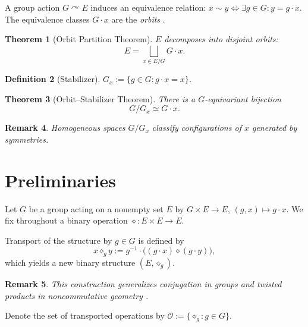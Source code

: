 \documentclass[11pt,a4paper]{article}
\newtheorem{theorem}{Theorem}[section]
\newtheorem{definition}[theorem]{Definition}
\newtheorem{remark}[theorem]{Remark}
\begin{document}
	A group action $G \curvearrowright E$ induces an equivalence relation: $x \sim y \iff \exists g \in G : y = g \cdot x$.
	The equivalence classes $G \cdot x$ are the \emph{orbits} \cite{Serre}.
	
	\begin{theorem}[Orbit Partition Theorem]
		$E$ decomposes into disjoint orbits:
		\[
		E = \bigsqcup_{x \in E/G} G \cdot x.
		\]
	\end{theorem}
	
	\begin{definition}[Stabilizer]
		$G_x := \{ g \in G : g \cdot x = x \}$.
	\end{definition}
	
	\begin{theorem}[Orbit–Stabilizer Theorem]
		There is a $G$-equivariant bijection
		\[
		G/G_x \simeq G \cdot x.
		\]
	\end{theorem}
	
	\begin{remark}
		Homogeneous spaces $G/G_x$ classify configurations of $x$ generated by symmetries.
	\end{remark}
	
	\section{Preliminaries}
	
	Let $G$ be a group acting on a nonempty set $E$ by $G \times E \to E$, $(g,x) \mapsto g \cdot x$.
	We fix throughout a binary operation $\diamond : E \times E \to E$.
	
	Transport of the structure by $g \in G$ is defined by
	\begin{equation}
		x \diamond_g y := g^{-1} \cdot \big((g \cdot x) \diamond (g \cdot y)\big), \label{eq:transport}
	\end{equation}
	which yields a new binary structure $(E, \diamond_g)$.
	
	\begin{remark}
		This construction generalizes conjugation in groups and twisted products in noncommutative geometry \cite{Connes}.
	\end{remark}
	
	Denote the set of transported operations by $\mathcal{O} := \{ \diamond_g : g \in G \}$.
	
\end{document}
